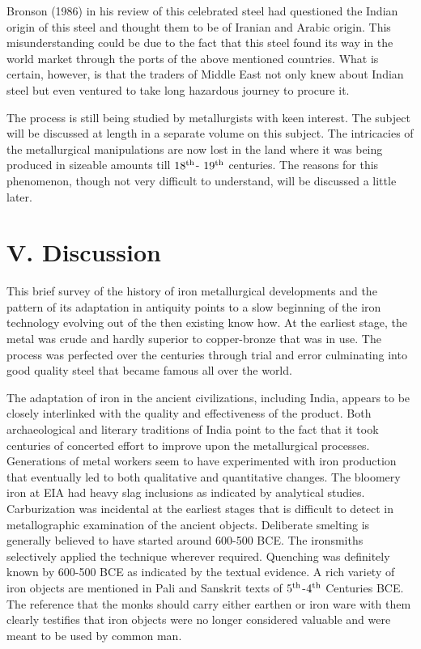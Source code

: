 Bronson (1986) in his review of this celebrated steel had questioned the Indian origin of this steel and thought them to be of Iranian and Arabic origin. This misunderstanding could be due to the fact that this steel found its way in the world market through the ports of the above mentioned countries. What is certain, however, is that the traders of Middle East not only knew about Indian steel but even ventured to take long hazardous journey to procure it.

The process is still being studied by metallurgists with keen interest. The subject will be discussed at length in a separate volume on this subject. The intricacies of the metallurgical manipulations are now lost in the land where it was being produced in sizeable amounts till $18^{\rm th}$- $19^{\rm th}$ centuries. The reasons for this phenomenon, though not very difficult to understand, will be discussed a little later. 

\section*{V. Discussion }\label{section-5}

This brief survey of the history of iron metallurgical developments and the pattern of its adaptation in antiquity points to a slow beginning of the iron technology evolving out of the then existing know how. At the earliest stage, the metal was crude and hardly superior to copper-bronze that was in use. The process was perfected over the centuries through trial and error culminating into good quality steel that became famous all over the world. 

The adaptation of iron in the ancient civilizations, including India, appears to be closely interlinked with the quality and effectiveness of the product. Both archaeological and literary traditions of India point to the fact that it took centuries of concerted effort to improve upon the metallurgical processes. Generations of metal workers seem to have experimented with iron production that eventually led to both qualitative and quantitative changes. The bloomery iron at EIA had heavy slag inclusions as indicated by analytical studies. Carburization was incidental at the earliest stages that is difficult to detect in metallographic examination of the ancient objects. Deliberate smelting is generally believed to have started around 600-500 BCE.  The ironsmiths selectively applied the technique wherever required. Quenching was definitely known by 600-500 BCE as indicated by the textual evidence. A rich variety of iron objects are mentioned   in Pali and Sanskrit texts of $5^{\rm th}$-$4^{\rm th}$ Centuries BCE. The reference that the monks should carry either earthen or iron ware with them clearly testifies that iron objects were no longer considered valuable and were meant to be used by common man.

